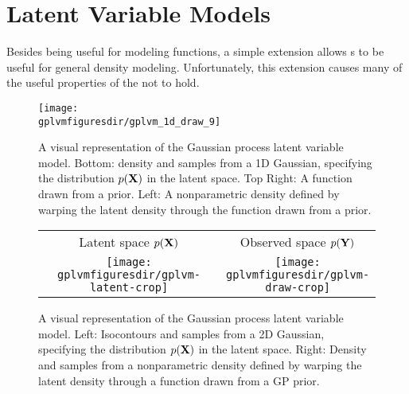 \section{Latent Variable Models}

Besides being useful for modeling functions, a simple extension allows \gp{}s to be useful for general density modeling.  Unfortunately, this extension causes many of the useful properties of the \gp{} not to hold.


\begin{figure}[t]
\begin{centering}
\texttt{[image: \\gplvmfiguresdir/gplvm\_1d\_draw\_9]}
\end{centering}
\caption[One-dimensional Gaussian process latent variable model]{A visual representation of the Gaussian process latent variable model.  Bottom: density and samples from a 1D Gaussian, specifying the distribution $p(\mathbf{X})$ in the latent space.  Top Right: A function drawn from a \gp{} prior.  Left: A nonparametric density defined by warping the latent density through the function drawn from a \gp{} prior.}  
\label{fig:oned-gplvm}
\end{figure}



\begin{figure}
\begin{centering}
{\begin{tabular}{cccc}
\phantom{h} & Latent space $p(\mathbf{X})$ & & Observed space $p(\mathbf{Y})$ \\
& \fbox{\texttt{[image: \\gplvmfiguresdir/gplvm-latent-crop]}} &
\raisebox{7em}{$\overset{\mathlarger{f(x)}}{\mathlarger{\mathlarger{\mathlarger{\mathlarger{\mathlarger{\mathlarger{\mathlarger{\rightarrow}}}}}}}}$} &
\fbox{\texttt{[image: \\gplvmfiguresdir/gplvm-draw-crop]}}
\end{tabular}}
\end{centering}
\caption[Two-dimensional Gaussian process latent variable model]{A visual representation of the Gaussian process latent variable model.  Left:  Isocontours and samples from a 2D Gaussian, specifying the distribution $p(\mathbf{X})$ in the latent space.  Right: Density and samples from a nonparametric density defined by warping the latent density through a function drawn from a GP prior.}  
\label{fig:twod-gplvm}
\end{figure}




